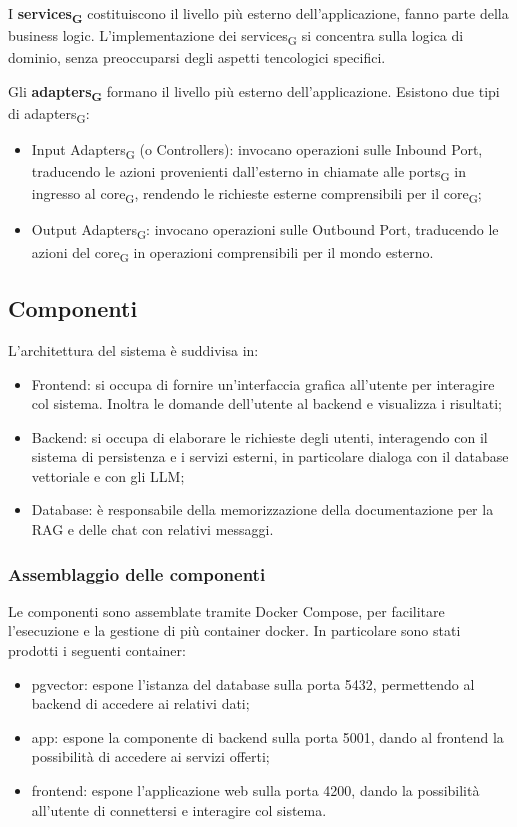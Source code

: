 I \textbf{services\textsubscript{G}} costituiscono il livello più esterno dell'applicazione, fanno parte della business logic. L'implementazione dei services\textsubscript{G} si concentra sulla logica di dominio, senza preoccuparsi degli aspetti tencologici specifici.

Gli \textbf{adapters\textsubscript{G}} formano il livello più esterno dell'applicazione. Esistono due tipi di adapters\textsubscript{G}: 
\begin{itemize}
    \item Input Adapters\textsubscript{G} (o Controllers): invocano operazioni sulle Inbound Port, traducendo le azioni provenienti dall'esterno in chiamate alle ports\textsubscript{G} in ingresso al core\textsubscript{G}, rendendo le richieste esterne comprensibili per il core\textsubscript{G};
    \item Output Adapters\textsubscript{G}: invocano operazioni sulle Outbound Port, traducendo le azioni del core\textsubscript{G} in operazioni comprensibili per il mondo esterno.
\end{itemize}

\subsection{Componenti}
L'architettura del sistema è suddivisa in:
\begin{itemize}
    \item Frontend: si occupa di fornire un'interfaccia grafica all'utente per interagire col sistema. Inoltra le domande dell'utente al backend e visualizza i risultati;
    \item Backend: si occupa di elaborare le richieste degli utenti, interagendo con il sistema di persistenza e i servizi esterni, in particolare dialoga con il database vettoriale e con gli LLM;
    \item Database: è responsabile della memorizzazione della documentazione per la RAG e delle chat con relativi messaggi.
\end{itemize}
\subsubsection{Assemblaggio delle componenti}
Le componenti sono assemblate tramite Docker Compose, per facilitare l'esecuzione e la gestione di più container docker. 
In particolare sono stati prodotti i seguenti container:
\begin{itemize}
    \item pgvector: espone l'istanza del database sulla porta 5432, permettendo al backend di accedere ai relativi dati;
    \item app: espone la componente di backend sulla porta 5001, dando al frontend la possibilità di accedere ai servizi offerti;
    \item frontend: espone l'applicazione web sulla porta 4200, dando la possibilità all'utente di connettersi e interagire col sistema.
\end{itemize}
